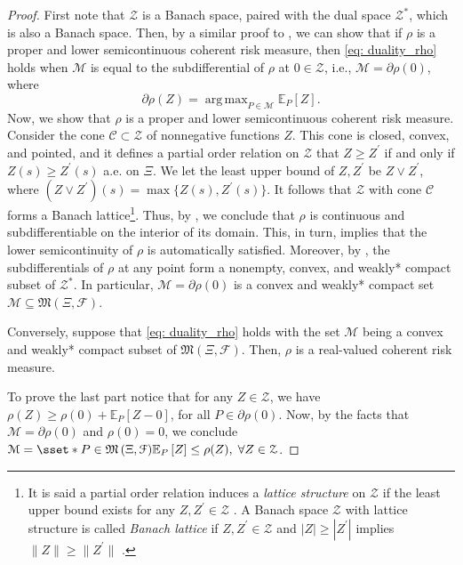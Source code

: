 \documentclass[final,onefignum,onetabnum]{class}
\DeclareMathOperator*{\argmax}{arg\,max}
\newcommand{\ee}[2]{\mathbb{E}_{#1} \left[ #2 \right]}
\newcommand{\Cs}[1]{\mathcal{#1}} %
\newcommand{\Fs}[1]{\mathfrak{#1}} %
\newcommand{\measurespace}{\left( \Xi, \Cs{F} \right)}
\begin{document}
\begin{proof}
    First note that $\Cs{Z}$ is a Banach space, paired with the dual space  $\Cs{Z}^{*}$, which is also a Banach space. Then, by a similar proof to \citet[Theorem~6.7]{shapiro2014SP}, we can show that if $\rho$ is a proper and lower semicontinuous coherent risk measure, then \eqref{eq: duality_rho} holds when $\Cs{M}$ is equal to the subdifferential of $\rho$ at $0 \in \Cs{Z}$, i.e., $\Cs{M}=\partial \rho(0)$, 
    where 
    $$\partial \rho(Z)=\argmax_{P \in \Cs{M}} \ee{P}{Z}.$$ 
    Now, we show that $\rho$ is a proper and lower semicontinuous coherent risk measure. Consider the cone $\Cs{C} \subset \Cs{Z}$ of nonnegative functions $Z$. This cone is closed, convex, and pointed, and it defines a partial order relation on $\Cs{Z}$ that $Z \ge Z^{\prime}$ if and only if $Z(s) \ge Z^{\prime}(s) $ a.e.  on $\Xi$. We let the least upper bound of $Z, Z^{\prime}$ be $Z \vee  Z^{\prime}$, where $(Z \vee  Z^{\prime})(s)=\max\{Z(s), Z^{\prime}(s)\}$. It follows that $\Cs{Z}$ with cone $\Cs{C}$ forms a Banach lattice\footnote{It is said a partial order relation induces a {\it lattice structure} on $\Cs{Z}$ if the least upper bound exists for any $Z, Z^{\prime} \in \Cs{Z}$ \cite{shapiro2014SP}. A Banach space $\Cs{Z}$ with lattice structure is called {\it Banach lattice} if $Z, Z^{\prime} \in \Cs{Z}$ and $|Z| \ge |Z^{\prime}|$ implies $\|Z\| \ge \|Z^{\prime}\|$ \cite{shapiro2014SP}.}. Thus, by  \citet[Theorem~7.91]{shapiro2014SP}, we conclude that $\rho$ is continuous and subdifferentiable on the interior of its domain. This, in turn, implies that the lower semicontinuity of $\rho$ is automatically satisfied. Moreover, by \citet[Theorem~7.85]{shapiro2014SP}, the subdifferentials of $\rho$ at any point form a nonempty, convex, and weakly* compact subset of $\Cs{Z}^{*}$. 
    In particular, $\Cs{M}=\partial \rho(0)$ is a convex and weakly* compact set $\Cs{M} \subseteq \Fs{M}\measurespace$. 
    
    Conversely, suppose that \eqref{eq: duality_rho} holds with the set $\Cs{M}$ being  a convex and weakly* compact subset of $\Fs{M}\measurespace$. Then, $\rho$ is a real-valued coherent risk measure. 
    
    To prove the last part notice that for any $Z \in \Cs{Z}$, we have $\rho(Z) \ge \rho(0)+ \ee{P}{Z-0}$, for all $P \in \partial \rho(0)$. Now, by  the facts that $\Cs{M}=\partial \rho(0)$ and  $\rho(0)=0$, we conclude 
    $\Cs{M}= \sset*{P \in \Fs{M}\measurespace}{\ee{P}{Z} \le \rho(Z), \;  \forall Z \in \Cs{Z}}$.
\end{proof}
\end{document}

